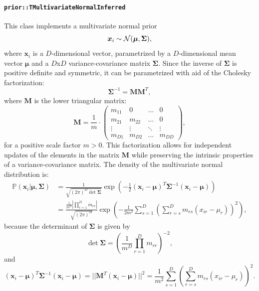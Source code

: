 \documentclass[a4paper,11pt]{article}
\def\M{\boldsymbol{M}}
\def\x{\boldsymbol{x}}
\def\bmu{\boldsymbol{\mu}}
\def\bSigma{\boldsymbol{\Sigma}}
\def\p{\mathbb{P}}
\newcommand{\class}[1]{\texttt{#1}}
\begin{document}
\paragraph{\class{prior::TMultivariateNormalInferred}}
This class implements a multivariate normal prior
\begin{equation*}
 \x_i \sim {\cal N}(\bmu, \bSigma),
\end{equation*}
where $\x_i$ is a $D$-dimensional vector, parametrized by a $D$-dimensional mean vector $\bmu$ and a $D$x$D$ variance-covariance matrix $\bSigma$. Since the inverse of $\bSigma$ is positive definite and symmetric, it can be parametrized with aid of the Cholesky factorization:
\begin{equation}\label{eq:MToSigma}
\bSigma^{-1}= \M \M^T,
\end{equation}
where $\M$ is the lower triangular matrix:
\begin{equation*}
\M = \frac{1}{m} \cdot \begin{pmatrix}
m_{11} & 0 &  \ldots & 0\\
m_{21} & m_{22} & \ldots & 0\\
\vdots & \vdots & \ddots & \vdots\\
m_{D1} & m_{D2} & \ldots & m_{DD}
\end{pmatrix},
\end{equation*}
for a positive scale factor $m > 0$. This factorization allows for independent updates of the elements in the matrix $\M$ while preserving the intrinsic properties of a variance-covariance matrix.
The density of the multivariate normal distribution is:
\begin{align}
\p(\x_i | \bmu, \bSigma) &= \frac{1}{\sqrt{(2\pi)^D \det\bSigma}} \exp\left(-\frac{1}{2} (\x_i-\bmu)^T \bSigma^{-1} (\x_i-\bmu) \right)\nonumber \\
&=\frac{\frac{1}{m^D}|\prod_{r = 1}^{D}m_{rr}|}{\sqrt{(2\pi)^D}} \exp\left(-\frac{1}{2m^2}\sum_{s = 1}^{D}\left(\sum_{r = s}^{D}m_{rs} (x_{ir} - \mu_r) \right)^2 \right), \label{eq:multivariateNormalDens}
\end{align}
because the determinant of $\bSigma$ is given by
\begin{equation*}
\det \bSigma = \left(\frac{1}{m^D} \prod_{r = 1}^{D} m_{rr}\right)^{-2},
\end{equation*}
and
\begin{equation*}
(\x_i-\bmu)^T \bSigma^{-1} (\x_i-\bmu) = ||\M^T (\x_i-\bmu)||^2 = \frac{1}{m^2}\sum_{s = 1}^{D}\left(\sum_{r = s}^{D}m_{rs} (x_{ir} - \mu_r) \right)^2.
\end{equation*}
\end{document}
